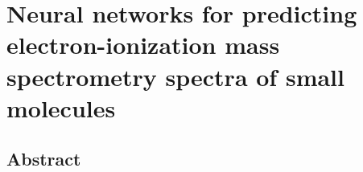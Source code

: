 \chapter{Neural networks for predicting electron-ionization mass spectrometry spectra of small molecules}
\thispagestyle{plain}
\vspace{-.5cm}

\section*{Abstract}
    \dsp
    



